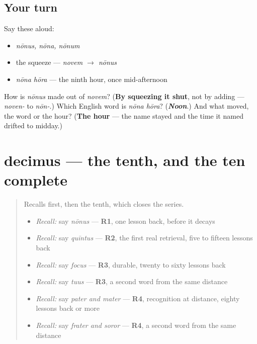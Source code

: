 \subsection*{Your turn}
Say these aloud:

\begin{itemize}
\raggedright
  \item \emph{nōnus, nōna, nōnum}
  \item the squeeze — \emph{novem $\to$ nōnus}
  \item \emph{nōna hōra} — the ninth hour, once mid-afternoon
\end{itemize}

\begin{tcolorbox}[breakable,colback=teal!4,colframe=teal!35!black,title={Before you move on}]
How is \emph{nōnus} made out of \emph{novem}? (\textbf{By squeezing it shut}, not by adding — \emph{noven-} to \emph{nōn-}.) Which English word is \emph{nōna hōra}? (\emph{\textbf{Noon}}.) And what moved, the word or the hour? (\textbf{The hour} — the name stayed and the time it named drifted to midday.)
\end{tcolorbox}
\section[decimus, decima, decimum]{decimus — the tenth, and the ten complete}

\label{lesson:LA-C56-decimus}



\begin{quote}
Recalls first, then the tenth, which closes the series.

\begin{itemize}
\raggedright
  \item \emph{Recall:} say \emph{nōnus} — \textbf{R1}, one lesson back, before it decays
  \item \emph{Recall:} say \emph{quīntus} — \textbf{R2}, the first real retrieval, five to fifteen lessons back
  \item \emph{Recall:} say \emph{focus} — \textbf{R3}, durable, twenty to sixty lessons back
  \item \emph{Recall:} say \emph{tuus} — \textbf{R3}, a second word from the same distance
  \item \emph{Recall:} say \emph{pater and mater} — \textbf{R4}, recognition at distance, eighty lessons back or more
  \item \emph{Recall:} say \emph{frater and soror} — \textbf{R4}, a second word from the same distance
\end{itemize}
\end{quote}

